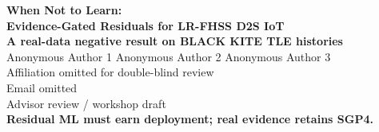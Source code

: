 \documentclass[aspectratio=169,10pt]{beamer}
\begin{document}
\begin{frame}[plain]
  \vspace{0.42cm}
  \begin{center}
    {\LARGE\bfseries When Not to Learn:}\\[2pt]
    {\LARGE\bfseries Evidence-Gated Residuals for LR-FHSS D2S IoT}\\[0.26cm]
    {\Large\bfseries\color{Navy} A real-data negative result on BLACK KITE TLE histories}\\[0.34cm]
    {\normalsize Anonymous Author 1 \quad Anonymous Author 2 \quad Anonymous Author 3}\\[0.06cm]
    {\small Affiliation omitted for double-blind review}\\
    {\small Email omitted}\\[0.32cm]
    {\scriptsize Advisor review / workshop draft}\\[0.42cm]
    {\Large\bfseries Residual ML must earn deployment; real evidence retains SGP4.}
  \end{center}
\end{frame}
\end{document}
